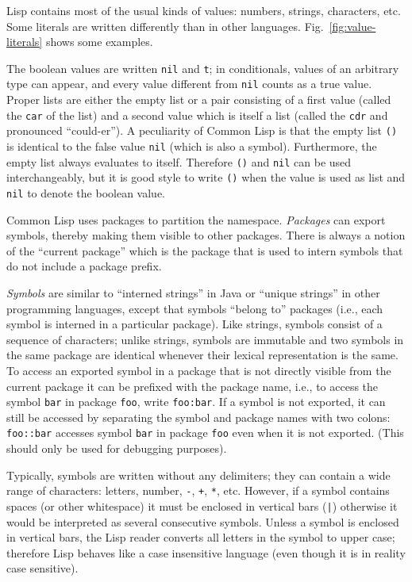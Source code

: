 \documentclass[a4paper]{amsart}
\begin{document}
Lisp contains most of the usual kinds of values: numbers, strings,
characters, etc.  Some literals are written differently than in other
languages.  Fig.~\ref{fig:value-literals} shows some examples.

The boolean values are written \texttt{nil} and \texttt{t}; in
conditionals, values of an arbitrary type can appear, and every value
different from \texttt{nil} counts as a true value.  Proper lists are
either the empty list or a pair consisting of a first value (called
the \texttt{car} of the list) and a second value which is itself a
list (called the \texttt{cdr} and pronounced ``could-er'').  A
peculiarity of Common Lisp is that the empty list \texttt{()} is
identical to the false value \texttt{nil} (which is also a symbol).
Furthermore, the empty list always evaluates to itself.  Therefore
\texttt{()} and \texttt{nil} can be used interchangeably, but it is
good style to write \texttt{()} when the value is used as list and
\texttt{nil} to denote the boolean value.

Common Lisp uses packages to partition the namespace.  \emph{Packages}
can export symbols, thereby making them visible to other packages.
There is always a notion of the ``current package'' which is the
package that is used to intern symbols that do not include a package
prefix.

\emph{Symbols} are similar to ``interned strings'' in Java or ``unique
strings'' in other programming languages, except that symbols ``belong
to'' packages (i.e., each symbol is interned in a particular package).
Like strings, symbols consist of a sequence of characters; unlike
strings, symbols are immutable and two symbols in the same package are
identical whenever their lexical representation is the same.  To
access an exported symbol in a package that is not directly visible
from the current package it can be prefixed with the package name,
i.e., to access the symbol \texttt{bar} in package \texttt{foo}, write
\texttt{foo:bar}.  If a symbol is not exported, it can still be
accessed by separating the symbol and package names with two colons:
\texttt{foo::bar} accesses symbol \texttt{bar} in package \texttt{foo}
even when it is not exported.  (This should only be used for debugging
purposes).  

Typically, symbols are written without any delimiters; they can
contain a wide range of characters: letters, number, \verb|-|,
\verb|+|, \verb|*|, etc. However, if a symbol contains spaces (or
other whitespace) it must be enclosed in vertical bars (\verb=|=)
otherwise it would be interpreted as several consecutive symbols.
Unless a symbol is enclosed in vertical bars, the Lisp reader converts
all letters in the symbol to upper case; therefore Lisp behaves like a
case insensitive language (even though it is in reality case
sensitive).
\end{document}
